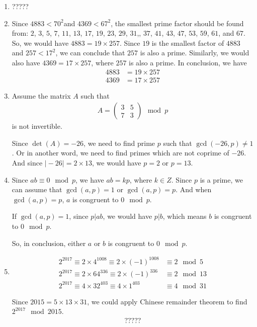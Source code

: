 \documentclass[11pt,a4paper]{article}
\begin{document}
\begin{enumerate}
	\item ?????
	
	\item Since $4883 < 70^{2}$and $4369 < 67^{2}$, the smallest prime factor should be found from: $2$, $3$, $5$, $7$, $11$, $13$, $17$, $19$, $23$, $29$, $31$,, $37$, $41$, $43$, $47$, $53$, $59$, $61$, and $67$. So, we would have $4883 = 19 \times 257$. Since $19$ is the smallest factor of $4883$ and $257 < 17^{2}$, we can conclude that $257$ is also a prime. Similarly, we would also have $4369 = 17 \times 257$, where $257$ is also a prime. In conclusion, we have
		\begin{align*}
			4883 &= 19 \times 257 \\
			4369 &= 17 \times 257
		\end{align*}
		
	\item Assume the matrix $A$ such that
		\begin{align*}
			A = \begin{pmatrix} 3 & 5 \\ 7 & 3 \end{pmatrix} \mod p
		\end{align*}
		is not invertible.
	\par Since $\det(A) = -26$, we need to find prime $p$ such that $\gcd(-26, p) \neq 1$. Or in another word, we need to find primes which are not coprime of $-26$. And since $\vert -26 \vert = 2 \times 13$, we would have $p = 2$ or $p = 13$.
	
	\item Since $ab \equiv 0 \mod p$, we have $ab = kp$, where $k \in Z$. Since $p$ is a prime, we can assume that $\gcd(a, p) = 1$ or $\gcd(a, p) = p$. And when $\gcd(a, p) = p$, $a$ is congruent to $0 \mod p$.
	\par If $\gcd(a, p) = 1$, since $p \vert ab$, we would have $p \vert b$, which means $b$ is congruent to $0 \mod p$.
	\par So, in conclusion, either $a$ or $b$ is congruent to $0 \mod p$.
	
	\item 
		\begin{align*}
			2^{2017} \equiv 2 \times 4^{1008} \equiv 2 \times (-1)^{1008} &\equiv 2 \mod 5 \\
			2^{2017} \equiv 2 \times 64^{336} \equiv 2 \times (-1)^{336} &\equiv 2 \mod 13 \\
			2^{2017} \equiv 4 \times 32^{403} \equiv 4 \times 1^{403} &\equiv 4 \mod 31
		\end{align*}
	\par Since $2015 = 5 \times 13 \times 31$, we could apply Chinese remainder theorem to find $2^{2017} \mod 2015$.
		\begin{align*}
			?????
		\end{align*}
	
\end{enumerate}
\end{document}
